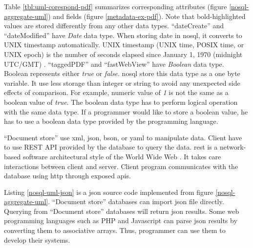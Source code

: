 Table \ref{tbl:uml-corespond-pdf} summarizes corresponding attributes (figure \ref{nosql-aggregate-uml}) and fields (figure \ref{metadata-ex-pdf}).
Note that bold-highlighted values are stored differently from any other data types.
\enquote{dateCreate} and \enquote{dateModified} have \textit{Date} data type.
When storing date in \gls{nosql}, it converts to UNIX timestamp automatically.
UNIX timestamp (UNIX time, POSIX time, or UNIX epoch) is the number of seconds elapsed since January 1, 1970 (midnight UTC/GMT) \cite{unix-time}.
\enquote{taggedPDF} and \enquote{fastWebView} have \textit{Boolean} data type.
Boolean represents either \textit{true} or \textit{false}.
\gls{nosql} store this data type as a one byte variable.
It use less storage than integer or string to avoid any unexpected side effects of comparison. 
For example, numeric value of \textit{1} is not the same as a boolean value of \textit{true}.
The boolean data type has to perform logical operation with the same data type.
If a programmer would like to store a boolean value, he has to use a boolean data type provided by the programming language.

\enquote{Document store} use \gls{xml}, \gls{json}, \gls{bson}, or \gls{yaml} to manipulate data.
Client have to use REST API provided by the database to query the data.
\gls{rest} is a network-based software architectural style of the World Wide Web \cite{doglio, masse_2012}.
It takes care interactions between client and server.
Client program communicates with the database using \gls{http} through exposed \glspl{api}.

Listing \ref{nosql-uml-json} is a \gls{json} source code implemented from figure \ref{nosql-aggregate-uml}.
\enquote{Document store} databases can import \gls{json} file directly.
Querying from \enquote{Document store} databases will return \gls{json} results.
Some web programming languages such as PHP and Javascript can parse \gls{json} results by converting them to associative arrays.
Thus, programmer can use them to develop their systems.
\begin{normalsize}

\end{normalsize}

